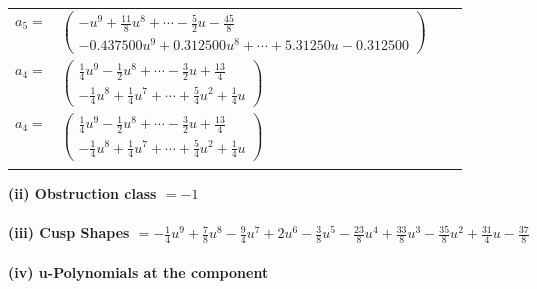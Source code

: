 \documentclass[1p]{elsarticle_modified}
\theoremstyle{definition}
\begin{document}
\begin{tabular}{m{7pt} m{180pt} m{7pt} m{180pt} }
\flushright $a_{5}=$&$\begin{pmatrix}- u^9+\frac{11}{8} u^8+\cdots-\frac{5}{2} u-\frac{45}{8}\\-0.437500 u^{9}+0.312500 u^{8}+\cdots+5.31250 u-0.312500\end{pmatrix}$ \\
\flushright $a_{4}=$&$\begin{pmatrix}\frac{1}{4} u^9-\frac{1}{2} u^8+\cdots-\frac{3}{2} u+\frac{13}{4}\\-\frac{1}{4} u^8+\frac{1}{4} u^7+\cdots+\frac{5}{4} u^2+\frac{1}{4} u\end{pmatrix}$\\ \flushright $a_{4}=$&$\begin{pmatrix}\frac{1}{4} u^9-\frac{1}{2} u^8+\cdots-\frac{3}{2} u+\frac{13}{4}\\-\frac{1}{4} u^8+\frac{1}{4} u^7+\cdots+\frac{5}{4} u^2+\frac{1}{4} u\end{pmatrix}$\\&\end{tabular}
\flushleft \textbf{(ii) Obstruction class $= -1$}\\~\\
\flushleft \textbf{(iii) Cusp Shapes $= -\frac{1}{4} u^9+\frac{7}{8} u^8-\frac{9}{4} u^7+2 u^6-\frac{3}{8} u^5-\frac{23}{8} u^4+\frac{33}{8} u^3-\frac{35}{8} u^2+\frac{31}{4} u-\frac{37}{8}$}\\~\\
\newpage\renewcommand{\arraystretch}{1}
\flushleft \textbf{(iv) u-Polynomials at the component}\newline \\
\end{document}
